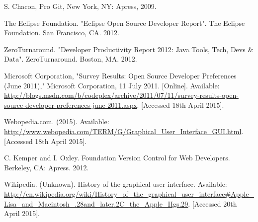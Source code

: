 \documentclass[12pt,a4paper,article,compsoc]{IEEEtran}
\begin{document}
\begin{thebibliography}{1}
			S. Chacon, Pro Git, New York, NY: Apress, 2009.
			
			The Eclipse Foundation. "Eclipse Open Source Developer Report". The Eclipse Foundation. San Francisco, CA. 2012.
			
			ZeroTurnaround. "Developer Productivity Report 2012: Java Tools, Tech, Devs \& Data". ZeroTurnaround. Boston, MA. 2012.
			
			Microsoft Corporation, "Survey Results: Open Source Developer Preferences (June 2011)," Microsoft Corporation, 11 July 2011. [Online]. Available: \url{http://blogs.msdn.com/b/codeplex/archive/2011/07/11/survey-results-open-source-developer-preferences-june-2011.aspx}. [Accessed 18th April 2015].
			
			Webopedia.com. (2015). Available: \url{http://www.webopedia.com/TERM/G/Graphical\_User\_Interface\_GUI.html}. [Accessed 18th April 2015].
			
			C. Kemper and I. Oxley. Foundation Version Control for Web Developers. Berkeley, CA: Apress. 2012.
			
			Wikipedia. (Unknown). History of the graphical user interface. Available: \url{http://en.wikipedia.org/wiki/History_of_the_graphical_user_interface#Apple_Lisa_and_Macintosh_.28and_later.2C_the_Apple_IIgs.29}.  [Accessed 20th April 2015].
			
		\end{thebibliography}
\end{document}
